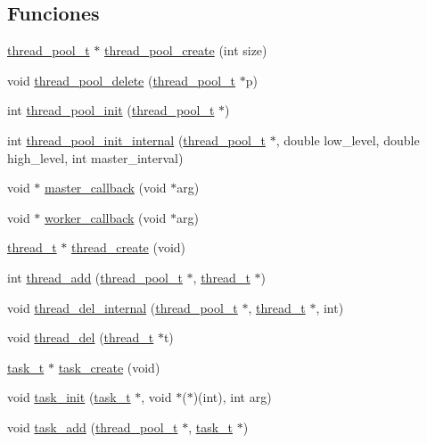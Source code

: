 \subsection*{Funciones}
\begin{DoxyCompactItemize}
\item 
\hyperlink{structthread__pool__t}{thread\+\_\+pool\+\_\+t} $\ast$ \hyperlink{G-2313-06-P1__thread__pool_8h_ae4c7364510f378011559c4eb6078e3ea}{thread\+\_\+pool\+\_\+create} (int size)
\item 
void \hyperlink{G-2313-06-P1__thread__pool_8h_a46b14e66a9466a68fa4f67a2e08e81fd}{thread\+\_\+pool\+\_\+delete} (\hyperlink{structthread__pool__t}{thread\+\_\+pool\+\_\+t} $\ast$p)
\item 
int \hyperlink{G-2313-06-P1__thread__pool_8h_aa9d4a7977fc5b5b534b60415a3aa7311}{thread\+\_\+pool\+\_\+init} (\hyperlink{structthread__pool__t}{thread\+\_\+pool\+\_\+t} $\ast$)
\item 
int \hyperlink{G-2313-06-P1__thread__pool_8h_a6f48d348c6ba66b0f85b6c0cb6d89737}{thread\+\_\+pool\+\_\+init\+\_\+internal} (\hyperlink{structthread__pool__t}{thread\+\_\+pool\+\_\+t} $\ast$, double low\+\_\+level, double high\+\_\+level, int master\+\_\+interval)
\item 
void $\ast$ \hyperlink{G-2313-06-P1__thread__pool_8h_a54703c23462be974a5e2511247921922}{master\+\_\+callback} (void $\ast$arg)
\item 
void $\ast$ \hyperlink{G-2313-06-P1__thread__pool_8h_a4ef081fb21acd34e0e2492a9f290b6a3}{worker\+\_\+callback} (void $\ast$arg)
\item 
\hyperlink{structthread__t}{thread\+\_\+t} $\ast$ \hyperlink{G-2313-06-P1__thread__pool_8h_a920e51bce81dfc069372dd87935db55e}{thread\+\_\+create} (void)
\item 
int \hyperlink{G-2313-06-P1__thread__pool_8h_a4820a76ce58452afff503b4ae218be5c}{thread\+\_\+add} (\hyperlink{structthread__pool__t}{thread\+\_\+pool\+\_\+t} $\ast$, \hyperlink{structthread__t}{thread\+\_\+t} $\ast$)
\item 
void \hyperlink{G-2313-06-P1__thread__pool_8h_aa2094f3613d648102f798506b1e86347}{thread\+\_\+del\+\_\+internal} (\hyperlink{structthread__pool__t}{thread\+\_\+pool\+\_\+t} $\ast$, \hyperlink{structthread__t}{thread\+\_\+t} $\ast$, int)
\item 
void \hyperlink{G-2313-06-P1__thread__pool_8h_a95970a6ee2f49963fc3fe7aefa677194}{thread\+\_\+del} (\hyperlink{structthread__t}{thread\+\_\+t} $\ast$t)
\item 
\hyperlink{structtask__t}{task\+\_\+t} $\ast$ \hyperlink{G-2313-06-P1__thread__pool_8h_afa05870619a7e753d41b8135b8514a2c}{task\+\_\+create} (void)
\item 
void \hyperlink{G-2313-06-P1__thread__pool_8h_a7241a5097164175e730f610eaad0aa5a}{task\+\_\+init} (\hyperlink{structtask__t}{task\+\_\+t} $\ast$, void $\ast$($\ast$)(int), int arg)
\item 
void \hyperlink{G-2313-06-P1__thread__pool_8h_a113acb632971a3b3acd2cda2c4620bb3}{task\+\_\+add} (\hyperlink{structthread__pool__t}{thread\+\_\+pool\+\_\+t} $\ast$, \hyperlink{structtask__t}{task\+\_\+t} $\ast$)
\end{DoxyCompactItemize}


